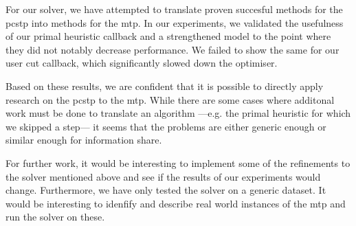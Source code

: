 For our solver, we have attempted to translate proven succesful methods for the \gls{pcstp}
into methods for
the \gls{mtp}.
In our experiments, we validated the usefulness of our primal heuristic callback and
a strengthened model to the point where they did not notably decrease performance.
We failed to show the same for our user cut callback, which significantly slowed down the
optimiser.

Based on these results, we are confident that it is possible to directly apply research on
the \gls{pcstp} to the \gls{mtp}. While there are some cases where additonal work must be
done to translate an algorithm ---e.g. the primal heuristic for which we skipped a step---
it seems that the problems are either generic enough or similar enough for information share.

For further work, it would be interesting to implement some of the refinements to the solver
mentioned above and see if the results of our experiments would change. Furthermore, we have
only tested the solver on a generic dataset. It would be interesting to idenfify and describe
real world instances of the \gls{mtp} and run the solver on these.



